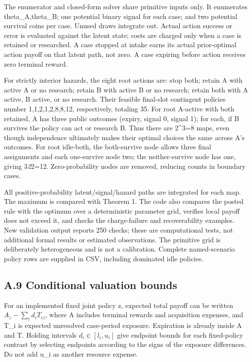 \documentclass[
  11pt,
]{article}
\begin{document}
The enumerator and closed-form solver share primitive inputs only. It
enumerates theta\_A,theta\_B; one potential binary signal for each case;
and two potential survival coins per case. Unused draws integrate out.
Actual action success or error is evaluated against the latent state;
costs are charged only when a case is retained or researched. A case
stopped at intake earns its actual prior-optimal action payoff on that
latent path, not zero. A case expiring before action receives zero
terminal reward.

For strictly interior hazards, the eight root actions are: stop both;
retain A with active A or no research; retain B with active B or no
research; retain both with A active, B active, or no research. Their
feasible final-slot contingent policies number 1,1,2,1,2,8,8,12,
respectively, totaling 35. For root A-active with both retained, A has
three public outcomes (expiry, signal 0, signal 1); for each, if B
survives the policy can act or research B. Thus there are 2\^{}3=8 maps,
even though independence ultimately makes their optimal choices the same
across A's outcomes. For root idle-both, the both-survive node allows
three final assignments and each one-survive node two; the
neither-survive node has one, giving 3\emph{2}2=12. Zero-probability
nodes are removed, reducing counts in boundary cases.

All positive-probability latent/signal/hazard paths are integrated for
each map. The maximum is compared with Theorem 1. The code also compares
the posted rule with the optimum over a deterministic parameter grid,
verifies local payoff does not exceed it, and checks the charge-failure
and recoverability examples. New validation output reports 250 checks;
these are computational tests, not additional formal results or
estimated observations. The primitive grid is deliberately heterogeneous
and is not a calibration. Complete named-scenario policy rows are
supplied in CSV, including dominated idle policies.

\subsection{A.9 Conditional valuation
bounds}\label{a.9-conditional-valuation-bounds}

For an implemented fixed joint policy z, expected total payoff can be
written \(A_z-\sum_i d_iT_{iz}\), where A includes terminal rewards and
acquisition expenses, and T\_i is expected unresolved case-period
exposure. Expiration is already inside A and T. Holding intervals
\(d_i\in[l_i,u_i]\) give endpoint bounds for each fixed-policy contrast
by selecting endpoints according to the signs of the exposure
differences. Do not add u\_i as another resource expense.
\end{document}

